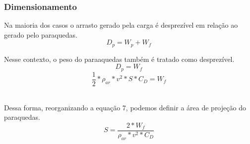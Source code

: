 \documentclass[a4paper, 12pt]{article}[abntex2]
\begin{document}
{                \subsubsection{Dimensionamento}
                    Na maioria dos casos o arrasto gerado pela carga é desprezível em relação ao gerado pelo paraquedas. \cite{knacke92}
                    \begin{equation}
                        D_p = W_p + W_f
                    \end{equation}
                    \par Nesse contexto, o peso do paraaquedas também é tratado como desprezível.\cite{miranda21}
                    \begin{equation}
                        D_p = W_f
                    \end{equation}
                    \begin{equation}
                        \frac{1}{2}*\rho_{ar}*v^2*S*C_D = W_f
                    \end{equation}
                    \\
                    \par Dessa forma, reorganizando a equação 7, podemos definir a área de projeção do paraquedas.\\
                    \begin{equation}
                        S = \frac {2*W_f}{\rho_{ar}* v^{2} * C_D }
                    \end{equation}
                    \\
}
\end{document}
